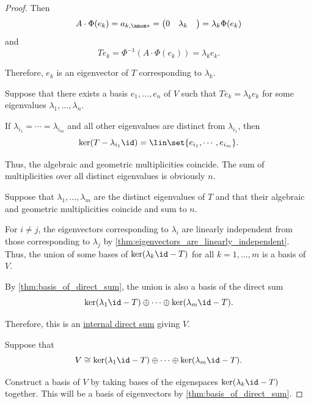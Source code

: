 \begin{proof}
  Then
  \begin{equation*}
    A \cdot \Phi(e_k) = a_{k,\anon*} = \begin{pmatrix} 0 & \lambda_k & \end{pmatrix} = \lambda_k \Phi(e_k)
  \end{equation*}
  and
  \begin{equation*}
    T e_k = \Phi^{-1}(A \cdot \Phi(e_k)) = \lambda_k e_k.
  \end{equation*}

  Therefore, \( e_k \) is an eigenvector of \( T \) corresponding to \( \lambda_k \).

   Suppose that there exists a basis \( e_1, \ldots, e_n \) of \( V \) such that \( Te_k = \lambda_k e_k \) for some eigenvalues \( \lambda_1, \ldots, \lambda_n \).

  If \( \lambda_{i_1} = \cdots = \lambda_{i_m} \) and all other eigenvalues are distinct from \( \lambda_{i_1} \), then
  \begin{equation*}
    \ker(T - \lambda_{i_1} \id) = \lin\set{ e_{i_1}, \cdots, e_{i_m} }.
  \end{equation*}

  Thus, the algebraic and geometric multiplicities coincide. The sum of multiplicities over all distinct eigenvalues is obviously \( n \).

   Suppose that \( \lambda_1, \ldots, \lambda_m \) are the distinct eigenvalues of \( T \) and that their algebraic and geometric multiplicities coincide and sum to \( n \).

  For \( i \neq j \), the eigenvectors corresponding to \( \lambda_i \) are linearly independent from those corresponding to \( \lambda_j \) by \cref{thm:eigenvectors_are_linearly_independent}. Thus, the union of some bases of \( \ker(\lambda_k \id - T) \) for all \( k = 1, \ldots, m \) is a basis of \( V \).

  By \cref{thm:basis_of_direct_sum}, the union is also a basis of the direct sum
  \begin{equation*}
    \ker(\lambda_1 \id - T) \oplus \cdots \oplus \ker(\lambda_m \id - T).
  \end{equation*}

  Therefore, this is an \hyperref[def:external_semimodule_direct_sum]{internal direct sum} giving \( V \).

   Suppose that
  \begin{equation*}
    V \cong \ker(\lambda_1 \id - T) \oplus \cdots \oplus \ker(\lambda_m \id - T).
  \end{equation*}

  Construct a basis of \( V \) by taking bases of the eigenspaces \( \ker(\lambda_k \id - T) \) together. This will be a basis of eigenvectors by \cref{thm:basis_of_direct_sum}.
\end{proof}

